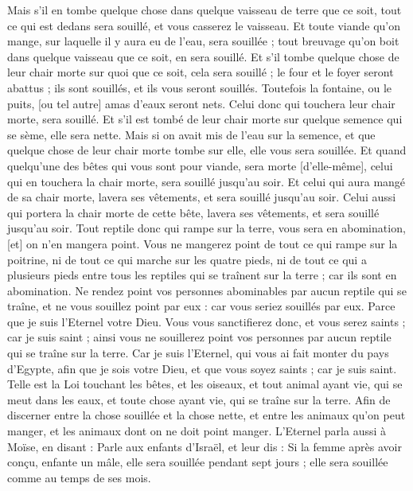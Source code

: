 \begin{multicols}{2}
Mais s'il en tombe quelque chose dans quelque vaisseau de terre que ce soit, tout ce qui est dedans sera souillé, et vous casserez le vaisseau.
Et toute viande qu'on mange, sur laquelle il y aura eu de l'eau, sera souillée ; tout breuvage qu'on boit dans quelque vaisseau que ce soit, en sera souillé.
Et s'il tombe quelque chose de leur chair morte sur quoi que ce soit, cela sera souillé ; le four et le foyer seront abattus ; ils sont souillés, et ils vous seront souillés.
Toutefois la fontaine, ou le puits, [ou tel autre] amas d'eaux seront nets. Celui donc qui touchera leur chair morte, sera souillé.
Et s'il est tombé de leur chair morte sur quelque semence qui se sème, elle sera nette.
Mais si on avait mis de l'eau sur la semence, et que quelque chose de leur chair morte tombe sur elle, elle vous sera souillée.
Et quand quelqu'une des bêtes qui vous sont pour viande, sera morte [d'elle-même], celui qui en touchera la chair morte, sera souillé jusqu'au soir.
Et celui qui aura mangé de sa chair morte, lavera ses vêtements, et sera souillé jusqu'au soir. Celui aussi qui portera la chair morte de cette bête, lavera ses vêtements, et sera souillé jusqu'au soir.
Tout reptile donc qui rampe sur la terre, vous sera en abomination, [et] on n'en mangera point.
Vous ne mangerez point de tout ce qui rampe sur la poitrine, ni de tout ce qui marche sur les quatre pieds, ni de tout ce qui a plusieurs pieds entre tous les reptiles qui se traînent sur la terre ; car ils sont en abomination.
Ne rendez point vos personnes abominables par aucun reptile qui se traîne, et ne vous souillez point par eux : car vous seriez souillés par eux.
Parce que je suis l'Eternel votre Dieu. Vous vous sanctifierez donc, et vous serez saints ; car je suis saint ; ainsi vous ne souillerez point vos personnes par aucun reptile qui se traîne sur la terre.
Car je suis l'Eternel, qui vous ai fait monter du pays d'Egypte, afin que je sois votre Dieu, et que vous soyez saints ; car je suis saint.
Telle est la Loi touchant les bêtes, et les oiseaux, et tout animal ayant vie, qui se meut dans les eaux, et toute chose ayant vie, qui se traîne sur la terre.
Afin de discerner entre la chose souillée et la chose nette, et entre les animaux qu'on peut manger, et les animaux dont on ne doit point manger.
\VerseOne{}L'Eternel parla aussi à Moïse, en disant :
Parle aux enfants d'Israël, et leur dis : Si la femme après avoir conçu, enfante un mâle, elle sera souillée pendant sept jours ; elle sera souillée comme au temps de ses mois.

\end{multicols}
